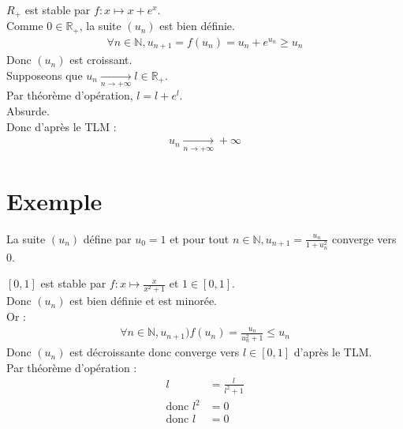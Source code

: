\documentclass[../main.tex]{subfiles}
\begin{document}
$R_+$ est stable par $f:x \mapsto x + e^x$. \\
Comme $0 \in \mathbb{R}_+$, la suite $(u_n)$ est bien définie. \\
\begin{align*}
    \forall n \in \mathbb{N}, u_{n+1} = f(u_n) = u_n + e^{u_n} \geq u_n
\end{align*}
Donc $(u_n)$ est croissant. \\
Supposeons que $u_n \underset{n \to +\infty}{\longrightarrow} l \in \mathbb{R}_+$. \\
Par théorème d'opération, $l = l + e^l$. \\
Absurde. \\
Donc d'après le TLM : 
\begin{align*}
    u_n \underset{n \to +\infty}{\longrightarrow} +\infty
\end{align*}

\section{Exemple}
\begin{tcolorbox}[title=Exemple 14.64, title filled=false, colframe=darkgreen, colback=darkgreen!10!white]
    La suite $(u_n)$ défine par $u_0 = 1$ et pour tout $n \in \mathbb{N}, u_{n+1} = \frac{u_n}{1 + u_n^2}$ converge vers $0$. 
\end{tcolorbox}

$[0,1]$ est stable par $f:x\mapsto \frac{x}{x^2 + 1}$ et $1 \in [0,1]$. \\
Donc $(u_n)$ est bien définie et est minorée. \\
Or : 
\begin{align*}
    \forall n \in \mathbb{N}, u_{n+1} ) f(u_n) = \frac{u_n}{u_n^2 + 1} \leq u_n
\end{align*}
Donc $(u_n)$ est décroissante donc converge vers $l \in [0,1]$ d'après le TLM. \\
Par théorème d'opération : 
\begin{align*}
    l &= \frac{l}{l^2 + 1} \\
    \text{donc } l^2 &= 0 \\
    \text{donc } l &= 0
\end{align*}

\setcounter{section}{65}
\end{document}
